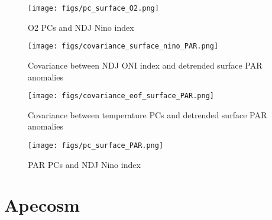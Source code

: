 \begin{figure}[h!]
\centering
    \texttt{[image: figs/pc\_surface\_O2.png]}
    \caption{O2 PCs and NDJ Nino index}
\end{figure}

\begin{figure}[h!]
\centering
    \texttt{[image: figs/covariance\_surface\_nino\_PAR.png]}
    \caption{Covariance between NDJ ONI index and detrended surface PAR anomalies}
\end{figure}

\begin{figure}[h!]
\centering
    \texttt{[image: figs/covariance\_eof\_surface\_PAR.png]}
    \caption{Covariance between temperature PCs and detrended surface PAR anomalies}
\end{figure}

\begin{figure}[h!]
\centering
    \texttt{[image: figs/pc\_surface\_PAR.png]}
    \caption{PAR PCs and NDJ Nino index}
\end{figure}

\begin{figure}[h]
    \begin{center}

        
        
    \end{center}
\end{figure}

\clearpage

\section{Apecosm}

